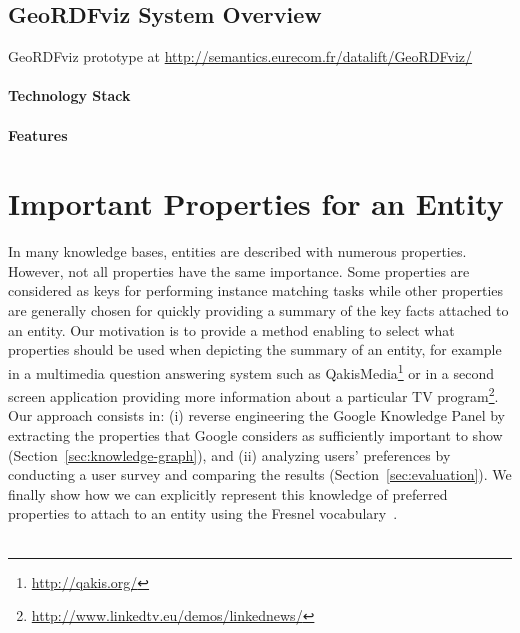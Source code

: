 \subsection{GeoRDFviz System Overview}
\label{sec:system}
GeoRDFviz prototype at \url{http://semantics.eurecom.fr/datalift/GeoRDFviz/}

\paragraph{Technology Stack}

\paragraph{Features}




\section{Important Properties for an Entity}
\label{sec:propEntities}
In many knowledge bases, entities are described with numerous properties. However, not all properties have the same importance. Some properties are considered as keys for performing instance matching tasks while other properties are generally chosen for quickly providing a summary of the key facts attached to an entity. Our motivation is to provide a method enabling to select what properties should be used when depicting the summary of an entity, for example in a multimedia question answering system such as QakisMedia\footnote{\url{http://qakis.org/}} or in a second screen application providing more information about a particular TV program\footnote{\url{http://www.linkedtv.eu/demos/linkednews/}}. Our approach consists in: (i) reverse engineering the Google Knowledge Panel by extracting the properties that Google considers as sufficiently important to show (Section~\ref{sec:knowledge-graph}), and (ii) analyzing users' preferences by conducting a user survey and comparing the results (Section~\ref{sec:evaluation}). We finally show how we can explicitly represent this knowledge of preferred properties to attach to an entity using the Fresnel vocabulary~\cite{pietriga2006}. \\
 \\

